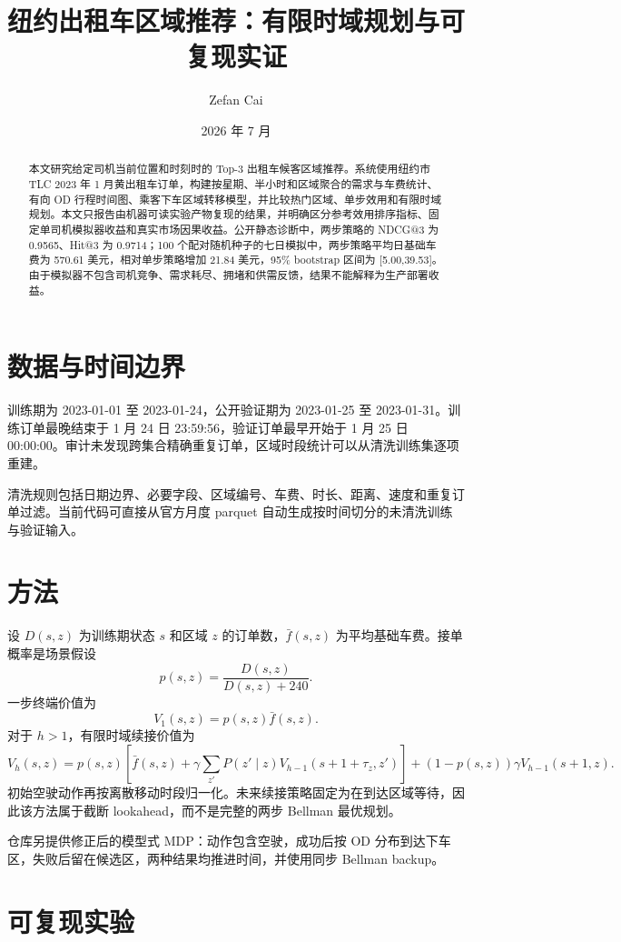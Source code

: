 \documentclass[11pt,a4paper]{ctexart}
\title{纽约出租车区域推荐：有限时域规划与可复现实证}
\author{Zefan Cai}
\date{2026 年 7 月}
\begin{document}
\maketitle

\begin{abstract}
本文研究给定司机当前位置和时刻时的 Top-3 出租车候客区域推荐。系统使用纽约市 TLC 2023 年 1 月黄出租车订单，构建按星期、半小时和区域聚合的需求与车费统计、有向 OD 行程时间图、乘客下车区域转移模型，并比较热门区域、单步效用和有限时域规划。本文只报告由机器可读实验产物复现的结果，并明确区分参考效用排序指标、固定单司机模拟器收益和真实市场因果收益。公开静态诊断中，两步策略的 NDCG@3 为 0.9565、Hit@3 为 0.9714；100 个配对随机种子的七日模拟中，两步策略平均日基础车费为 570.61 美元，相对单步策略增加 21.84 美元，95\% bootstrap 区间为 [5.00,39.53]。由于模拟器不包含司机竞争、需求耗尽、拥堵和供需反馈，结果不能解释为生产部署收益。
\end{abstract}

\section{数据与时间边界}

训练期为 2023-01-01 至 2023-01-24，公开验证期为 2023-01-25 至 2023-01-31。训练订单最晚结束于 1 月 24 日 23:59:56，验证订单最早开始于 1 月 25 日 00:00:00。审计未发现跨集合精确重复订单，区域时段统计可以从清洗训练集逐项重建。

清洗规则包括日期边界、必要字段、区域编号、车费、时长、距离、速度和重复订单过滤。当前代码可直接从官方月度 parquet 自动生成按时间切分的未清洗训练与验证输入。

\section{方法}

设 $D(s,z)$ 为训练期状态 $s$ 和区域 $z$ 的订单数，$\bar f(s,z)$ 为平均基础车费。接单概率是场景假设
\[
p(s,z)=\frac{D(s,z)}{D(s,z)+240}.
\]
一步终端价值为
\[
V_1(s,z)=p(s,z)\bar f(s,z).
\]
对于 $h>1$，有限时域续接价值为
\[
V_h(s,z)=p(s,z)\left[\bar f(s,z)+\gamma\sum_{z'}P(z'\mid z)V_{h-1}(s+1+\tau_z,z')\right]
+(1-p(s,z))\gamma V_{h-1}(s+1,z).
\]
初始空驶动作再按离散移动时段归一化。未来续接策略固定为在到达区域等待，因此该方法属于截断 lookahead，而不是完整的两步 Bellman 最优规划。

仓库另提供修正后的模型式 MDP：动作包含空驶，成功后按 OD 分布到达下车区，失败后留在候选区，两种结果均推进时间，并使用同步 Bellman backup。

\section{可复现实验}
\end{document}
